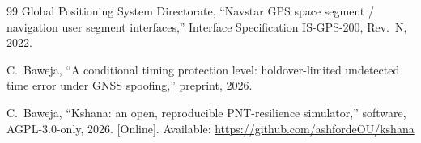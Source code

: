\documentclass[conference]{IEEEtran}
\begin{document}
\begin{thebibliography}{99}
 Global Positioning System Directorate, ``Navstar GPS space
segment / navigation user segment interfaces,'' Interface Specification
IS-GPS-200, Rev.~N, 2022.

 C.~Baweja, ``A conditional timing protection level:
holdover-limited undetected time error under GNSS spoofing,'' preprint, 2026.

 C.~Baweja, ``Kshana: an open, reproducible PNT-resilience
simulator,'' software, AGPL-3.0-only, 2026. [Online]. Available:
\url{https://github.com/ashfordeOU/kshana}
\end{thebibliography}
\end{document}
